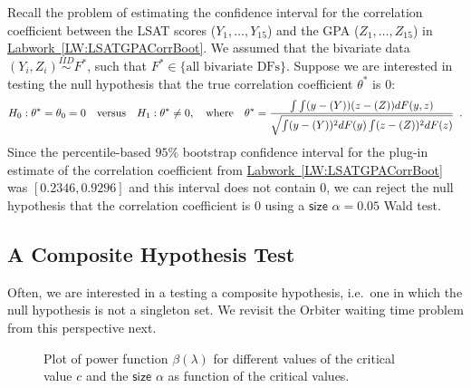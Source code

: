 \begin{example}
Recall the problem of estimating the confidence interval for the correlation coefficient between the LSAT scores ($Y_1,\ldots,Y_{15}$) and the GPA ($Z_1,\ldots,Z_{15}$) in \hyperref[LW:LSATGPACorrBoot]{Labwork~\ref*{LW:LSATGPACorrBoot}}.  We assumed that the bivariate data $(Y_i,Z_i) \overset{IID}{\sim} F^*$, such that $F^* \in \{ \text{all bivariate DFs} \}$. Suppose we are interested in testing the null hypothesis that the true correlation coefficient $\theta^*$ is $0$:
\[
H_0: \theta^* = \theta_0 = 0 \quad \text{versus} \quad H_1: \theta^* \neq 0, \quad \text{where} \quad  \theta^* = \frac{\int \int (y-\mathscr{(}Y))(z-\mathscr{(}Z))dF(y,z)}{\sqrt{\int (y-\mathscr{(}Y))^2 dF(y) \int (z-\mathscr{(}Z))^2 dF(z)}} \enspace .
\]
Since the percentile-based $95\%$ bootstrap confidence interval for the plug-in estimate of the correlation coefficient from \hyperref[LW:LSATGPACorrBoot]{Labwork~\ref*{LW:LSATGPACorrBoot}} was $[0.2346, 0.9296]$ and this interval does not contain $0$, we can reject the null hypothesis that the correlation coefficient is $0$ using a $\mathsf{size}$ $\alpha=0.05$ Wald test.
\end{example}

\subsection{A Composite Hypothesis Test}
Often, we are interested in a testing a composite hypothesis, i.e.~one in which  the null hypothesis is not a singleton set.  We revisit the Orbiter waiting time problem from this perspective next.
\begin{figure}[htpb]
\caption{Plot of power function $\beta(\lambda)$ for different values of the critical value $c$ and the $\mathsf{size}$ $\alpha$ as function of the critical values.
\label{F:ExponentialTestOrbiter}}
\centering   {}
\end{figure}

